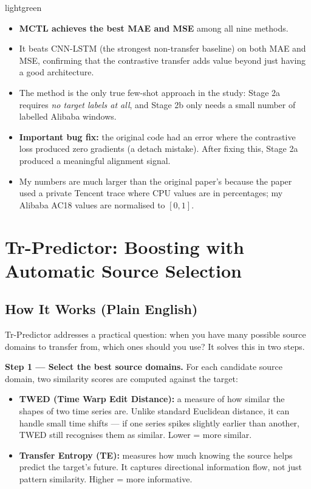 \documentclass[12pt,a4paper]{article}
\begin{document}
\begin{keybox}{lightgreen}
\begin{itemize}[leftmargin=*,noitemsep]
  \item \textbf{MCTL achieves the best MAE and MSE} among all nine methods.
  \item It beats CNN-LSTM (the strongest non-transfer baseline) on both MAE
        and MSE, confirming that the contrastive transfer adds value beyond
        just having a good architecture.
  \item The method is the only true few-shot approach in the study: Stage 2a
        requires \emph{no target labels at all}, and Stage 2b only needs a
        small number of labelled Alibaba windows.
  \item \textbf{Important bug fix:} the original code had an error where the
        contrastive loss produced zero gradients (a detach mistake). After
        fixing this, Stage 2a produced a meaningful alignment signal.
  \item My numbers are much larger than the original paper's because the
        paper used a private Tencent trace where CPU values are in
        percentages; my Alibaba AC18 values are normalised to $[0,1]$.
\end{itemize}
\end{keybox}

\section{\textcolor{trcolor}{Tr-Predictor}: Boosting with Automatic Source Selection}
\label{sec:tr_predictor}

\subsection{How It Works (Plain English)}

Tr-Predictor addresses a practical question: when you have many possible source
domains to transfer from, which ones should you use? It solves this in two steps.

\textbf{Step 1 --- Select the best source domains.}
For each candidate source domain, two similarity scores are computed against the
target:

\begin{itemize}
  \item \textbf{TWED (Time Warp Edit Distance):} a measure of how similar the
        shapes of two time series are. Unlike standard Euclidean distance, it
        can handle small time shifts --- if one series spikes slightly earlier
        than another, TWED still recognises them as similar. Lower = more similar.
  \item \textbf{Transfer Entropy (TE):} measures how much knowing the source
        helps predict the target's future. It captures directional information
        flow, not just pattern similarity. Higher = more informative.
\end{itemize}
\end{document}
